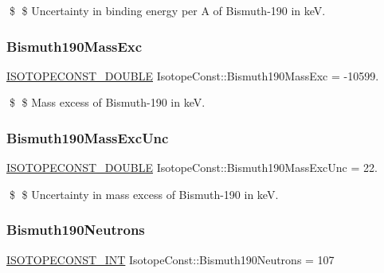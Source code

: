 \$ \$ Uncertainty in binding energy per A of Bismuth-\/190 in keV. \mbox{\label{group___isotope_const-_bismuth-_bi190_ga2192d377bfecb248a8537eb2b4a19a08}} 
\subsubsection{\texorpdfstring{Bismuth190\+Mass\+Exc}{Bismuth190MassExc}}
{\footnotesize\ttfamily \mbox{\hyperlink{group___isotope_const-_macros_ga8f45a7272ce02c0b4c65c44636ed719a}{I\+S\+O\+T\+O\+P\+E\+C\+O\+N\+S\+T\+\_\+\+D\+O\+U\+B\+LE}} Isotope\+Const\+::\+Bismuth190\+Mass\+Exc = -\/10599.}

\$ \$ Mass excess of Bismuth-\/190 in keV. \mbox{\label{group___isotope_const-_bismuth-_bi190_gaf6e7230dc155a66d5db89d6d3aa7ad1a}} 
\subsubsection{\texorpdfstring{Bismuth190\+Mass\+Exc\+Unc}{Bismuth190MassExcUnc}}
{\footnotesize\ttfamily \mbox{\hyperlink{group___isotope_const-_macros_ga8f45a7272ce02c0b4c65c44636ed719a}{I\+S\+O\+T\+O\+P\+E\+C\+O\+N\+S\+T\+\_\+\+D\+O\+U\+B\+LE}} Isotope\+Const\+::\+Bismuth190\+Mass\+Exc\+Unc = 22.}

\$ \$ Uncertainty in mass excess of Bismuth-\/190 in keV. \mbox{\label{group___isotope_const-_bismuth-_bi190_ga2678e4c67aa4656dcbf408418bcdf530}} 
\subsubsection{\texorpdfstring{Bismuth190\+Neutrons}{Bismuth190Neutrons}}
{\footnotesize\ttfamily \mbox{\hyperlink{group___isotope_const-_macros_ga5f18360b3e99483a35c32d789e62621c}{I\+S\+O\+T\+O\+P\+E\+C\+O\+N\+S\+T\+\_\+\+I\+NT}} Isotope\+Const\+::\+Bismuth190\+Neutrons = 107}


